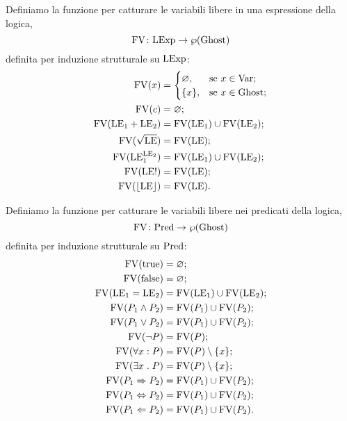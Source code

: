 \begin{definizione} 
Definiamo la funzione per catturare le variabili libere in una espressione della logica,
\[
  \mathord{\mathrm{FV}}\colon\mathrm{LExp}\to\wp(\mathrm{Ghost})
\] 
definita per induzione strutturale su $\mathrm{LExp}$:
\begin{align*}
   \mathrm{FV}(x)
      &=
        \begin{cases}
            \varnothing,&\text{se $x  \in \mathrm{Var}$};\\
            \{x\},    &\text{se $x  \in \mathrm{Ghost}$};
        \end{cases} \\
   \mathrm{FV}(c)
      &= \varnothing;\\
   \mathrm{FV}(\mathrm{LE}_1 + \mathrm{LE}_2)
      &= \mathrm{FV}(\mathrm{LE}_1) \cup \mathrm{FV}(\mathrm{LE}_2);\\
   \mathrm{FV}(\sqrt{\mathrm{LE}})
      &= \mathrm{FV}(\mathrm{LE});\\
   \mathrm{FV}(\mathrm{LE}_1^{\mathrm{LE}_2})
      &= \mathrm{FV}(\mathrm{LE}_1) \cup \mathrm{FV}(\mathrm{LE}_2);\\
   \mathrm{FV}(\mathrm{LE}!)
      &= \mathrm{FV}(\mathrm{LE});\\
   \mathrm{FV}(\lfloor \mathrm{LE} \rfloor)
      &= \mathrm{FV}(\mathrm{LE}).
\end{align*}
\end{definizione}

\begin{definizione} 
Definiamo la funzione per catturare
le variabili libere nei predicati della logica,
\[
  \mathord{\mathrm{FV}}\colon\mathrm{Pred}\to\wp(\mathrm{Ghost}) 
\]
definita per induzione strutturale su $\mathrm{Pred}$:
\begin{align*}
   \mathrm{FV}(\mathrm{true})
      &= \varnothing;\\
   \mathrm{FV}(\mathrm{false})
      &= \varnothing;\\
   \mathrm{FV}(\mathrm{LE}_1 = \mathrm{LE}_2)
      &= \mathrm{FV}(\mathrm{LE}_1) \cup \mathrm{FV}(\mathrm{LE}_2);\\
   \mathrm{FV}(P_1 \land P_2)
      &= \mathrm{FV}(P_1) \cup \mathrm{FV}(P_2);\\
   \mathrm{FV}(P_1 \lor P_2)
      &= \mathrm{FV}(P_1) \cup \mathrm{FV}(P_2);\\
   \mathrm{FV}(\neg P)
      &= \mathrm{FV}(P);\\
   \mathrm{FV}(\forall x \mathrel{:} P)
      &= \mathrm{FV}(P)\setminus \{x\};\\
   \mathrm{FV}(\exists x \mathrel{.} P)
      &= \mathrm{FV}(P)\setminus \{x\};\\
   \mathrm{FV}(P_1 \Rightarrow P_2)
      &= \mathrm{FV}(P_1) \cup \mathrm{FV}(P_2);\\
   \mathrm{FV}(P_1 \Leftrightarrow P_2)
      &= \mathrm{FV}(P_1) \cup \mathrm{FV}(P_2);\\
   \mathrm{FV}(P_1 \Leftarrow P_2)
      &= \mathrm{FV}(P_1) \cup \mathrm{FV}(P_2).
\end{align*}
\end{definizione}

